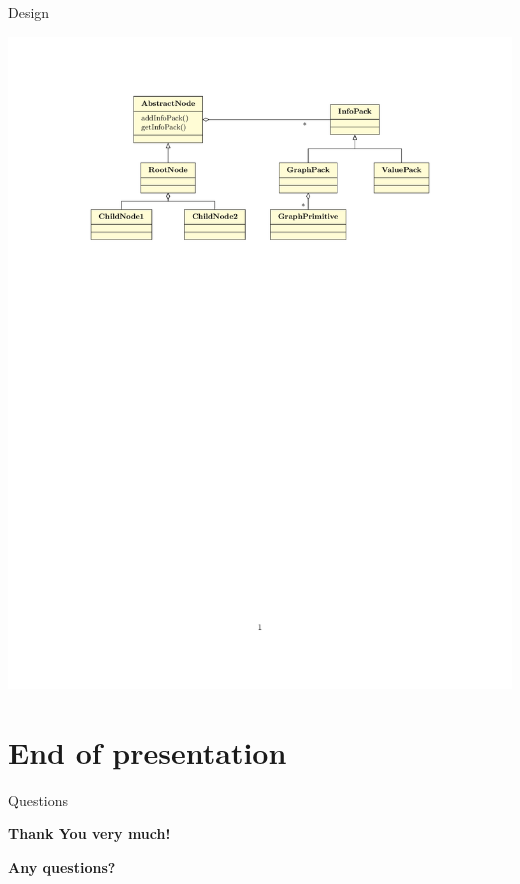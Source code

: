 \documentclass[12pt,xcolor=svgnames]{beamer}
\begin{document}
\begin{frame}{Design}
  \begin{center}
    \includegraphics[scale=0.25]{class-diagram.png}
  \end{center}
\end{frame}

\section{End of presentation}

\begin{frame}{Questions}
  \begin{block}{}
    \begin{center}
      \textbf{\Large{Thank You very much!}}
    \end{center}
  \end{block}

  \begin{block}{}
    \begin{center}
      \textbf{\Large{Any questions?}}
    \end{center}
  \end{block}
\end{frame}
\end{document}
